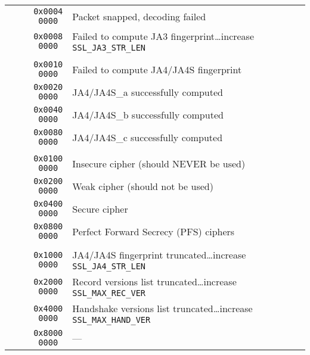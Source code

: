 \documentclass[documentation]{subfiles}
\begin{document}
\begin{longtable}{>{\tt}rl}
    0x0004 0000 & Packet snapped, decoding failed\\
    0x0008 0000 & Failed to compute JA3 fingerprint\ldots increase {\tt SSL\_JA3\_STR\_LEN}\\
    \\
    0x0010 0000 & Failed to compute JA4/JA4S fingerprint\\
    0x0020 0000 & JA4/JA4S\_a successfully computed\\
    0x0040 0000 & JA4/JA4S\_b successfully computed\\
    0x0080 0000 & JA4/JA4S\_c successfully computed\\
    \\
    0x0100 0000 & Insecure cipher (should NEVER be used)\\
    0x0200 0000 & Weak cipher (should not be used)\\
    0x0400 0000 & Secure cipher\\
    0x0800 0000 & Perfect Forward Secrecy (PFS) ciphers\\
    \\
    0x1000 0000 & JA4/JA4S fingerprint truncated\ldots increase {\tt SSL\_JA4\_STR\_LEN}\\
    0x2000 0000 & Record versions list truncated\ldots increase {\tt SSL\_MAX\_REC\_VER}\\
    0x4000 0000 & Handshake versions list truncated\ldots increase {\tt SSL\_MAX\_HAND\_VER}\\
    0x8000 0000 & ---\\
    \bottomrule
\end{longtable}
\end{document}
